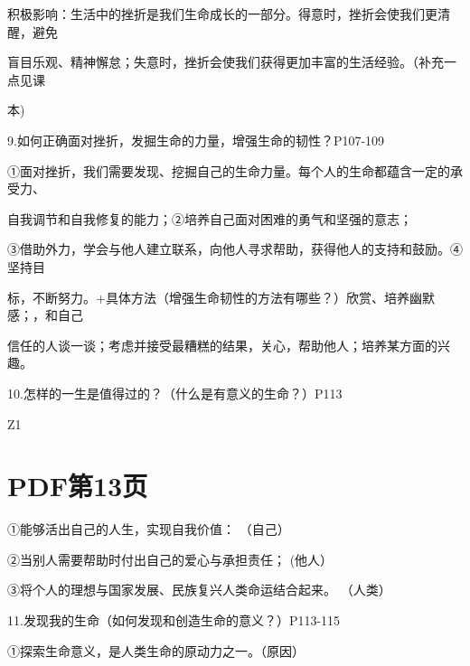 \documentclass[lang=cn,11pt]{elegantbook}
\newcommand{\daofasym}[1]{{\daofasymbolfont #1}}
\newcommand{\daofasym}[1]{#1}
\begin{document}
积极影响：生活中的挫折是我们生命成长的一部分。得意时，挫折会使我们更清醒，避免\par

盲目乐观、精神懈怠；失意时，挫折会使我们获得更加丰富的生活经验。（补充一点见课\par

本)\par

9.如何正确面对挫折，发掘生命的力量，增强生命的韧性？P107-109\par

\daofasym{①}面对挫折，我们需要发现、挖掘自己的生命力量。每个人的生命都蕴含一定的承受力、\par

自我调节和自我修复的能力；\daofasym{②}培养自己面对困难的勇气和坚强的意志；\par

\daofasym{③}借助外力，学会与他人建立联系，向他人寻求帮助，获得他人的支持和鼓励。\daofasym{④}坚持目\par

标，不断努力。+具体方法（增强生命韧性的方法有哪些？）欣赏、培养幽默感；，和自己\par

信任的人谈一谈；考虑并接受最糟糕的结果，关心，帮助他人；培养某方面的兴趣。\par

10.怎样的一生是值得过的？（什么是有意义的生命？）P113\par

Z1\par


\section*{PDF第13页}

\daofasym{①}能够活出自己的人生，实现自我价值： （自己）\par

\daofasym{②}当别人需要帮助时付出自己的爱心与承担责任； (他人）\par

\daofasym{③}将个人的理想与国家发展、民族复兴人类命运结合起来。 （人类）\par

11.发现我的生命（如何发现和创造生命的意义？）P113-115\par

\daofasym{①}探索生命意义，是人类生命的原动力之一。（原因）\par
\end{document}
